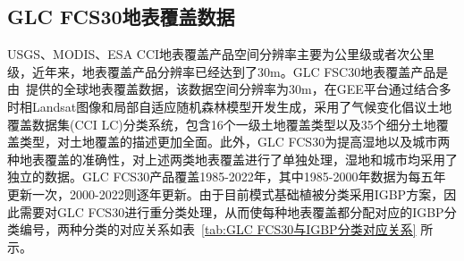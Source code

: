 \subsection{GLC FCS30地表覆盖数据}\label{GLC FCS30地表覆盖数据}
USGS、MODIS、ESA CCI地表覆盖产品空间分辨率主要为公里级或者次公里级，近年来，地表覆盖产品分辨率已经达到了30m。GLC FSC30地表覆盖产品是由~\citet{zhang2023glc_fcs30d}提供的全球地表覆盖数据，该数据空间分辨率为30m，在GEE平台通过结合多时相Landsat图像和局部自适应随机森林模型开发生成，采用了气候变化倡议土地覆盖数据集(CCI LC)分类系统，包含16个一级土地覆盖类型以及35个细分土地覆盖类型，对土地覆盖的描述更加全面。此外，GLC FCS30为提高湿地以及城市两种地表覆盖的准确性，对上述两类地表覆盖进行了单独处理，湿地和城市均采用了独立的数据。GLC FCS30产品覆盖1985-2022年，其中1985-2000年数据为每五年更新一次，2000-2022则逐年更新。由于目前模式基础植被分类采用IGBP方案，因此需要对GLC FCS30进行重分类处理，从而使每种地表覆盖都分配对应的IGBP分类编号，两种分类的对应关系如表~\ref{tab:GLC FCS30与IGBP分类对应关系} 所示。
